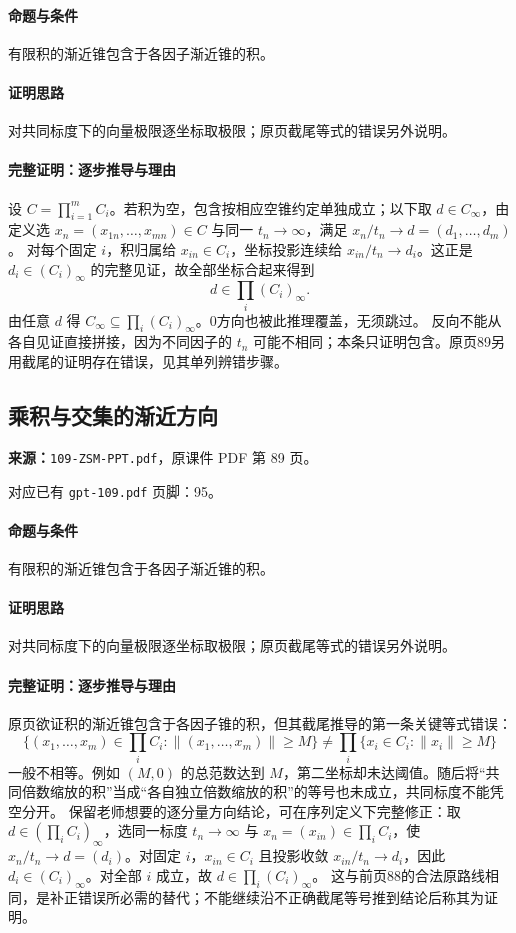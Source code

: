 \paragraph{命题与条件}有限积的渐近锥包含于各因子渐近锥的积。
\paragraph{证明思路}对共同标度下的向量极限逐坐标取极限；原页截尾等式的错误另外说明。
\paragraph{完整证明：逐步推导与理由}

设 $C=\prod_{i=1}^mC_i$。若积为空，包含按相应空锥约定单独成立；以下取 $d\in C_\infty$，由定义选 $x_n=(x_{1n},\ldots,x_{mn})\in C$ 与同一 $t_n\to\infty$，满足 $x_n/t_n\to d=(d_1,\ldots,d_m)$。
对每个固定 $i$，积归属给 $x_{in}\in C_i$，坐标投影连续给 $x_{in}/t_n\to d_i$。这正是 $d_i\in(C_i)_\infty$ 的完整见证，故全部坐标合起来得到
\[d\in\prod_i(C_i)_\infty.\]
由任意 $d$ 得 $C_\infty\subseteq\prod_i(C_i)_\infty$。0方向也被此推理覆盖，无须跳过。
反向不能从各自见证直接拼接，因为不同因子的 $t_n$ 可能不相同；本条只证明包含。原页89另用截尾的证明存在错误，见其单列辨错步骤。

\clearpage\subsection{乘积与交集的渐近方向}
\textbf{来源：}\texttt{109-ZSM-PPT.pdf}，原课件 PDF 第 89 页。\par
对应已有 \texttt{gpt-109.pdf} 页脚：95。\par
\paragraph{命题与条件}有限积的渐近锥包含于各因子渐近锥的积。
\paragraph{证明思路}对共同标度下的向量极限逐坐标取极限；原页截尾等式的错误另外说明。
\paragraph{完整证明：逐步推导与理由}

原页欲证积的渐近锥包含于各因子锥的积，但其截尾推导的第一条关键等式错误：
\[\{(x_1,\ldots,x_m)\in\prod_iC_i:\|(x_1,\ldots,x_m)\|\ge M\}\ne\prod_i\{x_i\in C_i:\|x_i\|\ge M\}\]
一般不相等。例如 $(M,0)$ 的总范数达到 $M$，第二坐标却未达阈值。随后将“共同倍数缩放的积”当成“各自独立倍数缩放的积”的等号也未成立，共同标度不能凭空分开。
保留老师想要的逐分量方向结论，可在序列定义下完整修正：取 $d\in(\prod_iC_i)_\infty$，选同一标度 $t_n\to\infty$ 与 $x_n=(x_{in})\in\prod_iC_i$，使 $x_n/t_n\to d=(d_i)$。对固定 $i$，$x_{in}\in C_i$ 且投影收敛 $x_{in}/t_n\to d_i$，因此 $d_i\in(C_i)_\infty$。对全部 $i$ 成立，故 $d\in\prod_i(C_i)_\infty$。
这与前页88的合法原路线相同，是补正错误所必需的替代；不能继续沿不正确截尾等号推到结论后称其为证明。

